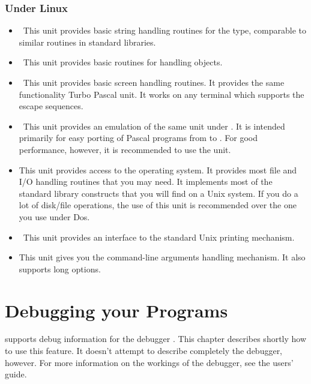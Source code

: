 \documentclass{report}
\begin{document}
\subsection{Under Linux}
\begin{itemize}
\item \seestrings\ This unit provides basic
string handling routines for the  type, comparable to similar
routines in standard  libraries.
\item \seeobjects\ This unit provides basic
routines for handling objects.
\item \seecrt\ This unit provides basic screen
handling routines. It provides the same functionality Turbo Pascal 
unit. It works on any terminal which supports the  escape
sequences.
\item \seedos\ This unit provides an emulation of the
same unit under \dos. It is intended primarily for easy porting of Pascal
programs from \dos to \linux. For good performance, however, it is
recommended to use the  unit.
\item \seelinux This unit provides access to the
\linux operating system. It provides most file and I/O handling routines
that you may need. It implements most of the standard  library constructs
that you will find on a Unix system. If you do a lot of disk/file
operations, the use of this unit is recommended over the one you use under
Dos.
\item \seeprinter\ This unit provides an
interface to the standard Unix printing mechanism.
\item \seegetopts This unit gives you the
\gnu {} command-line arguments  handling mechanism. 
It also supports long options.
\end{itemize}


\chapter{Debugging your Programs}

\fpk supports debug information for the \gnu debugger . 
This chapter describes shortly how to use this feature. It doesn't attempt
to describe completely the \gnu debugger, however.
For more information on the workings of the \gnu debugger, see the 
users' guide.
\end{document}
